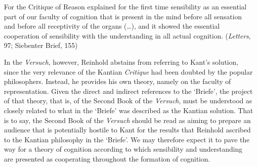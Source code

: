 For the Critique of Reason explained for the first time sensibility as an essential part of our faculty of cognition that is present in the mind before all sensation and before all receptivity of the organs (\ldots ), and it showed the essential cooperation of sensibility with the understanding in all actual cognition. (\textit{Letters}, 97; Siebenter Brief, 155)

In the \textit{Versuch}, however, Reinhold abstains from referring to Kant's solution, since the very relevance of the Kantian \textit{Critique} had been doubted by the popular philosophers. Instead, he provides his own theory, namely on the faculty of representation. Given the direct and indirect references to the `Briefe', the project of that theory, that is, of the Second Book of the \textit{Versuch}, must be understood as closely related to what in the `Briefe' was described as the Kantian solution. That is to say, the Second Book of the \textit{Versuch} should be read as aiming to prepare an audience that is potentially hostile to Kant for the results that Reinhold ascribed to the Kantian philosophy in the `Briefe'. We may therefore expect it to pave the way for a theory of cognition according to which sensibility and understanding are presented as cooperating throughout the formation of cognition. 

